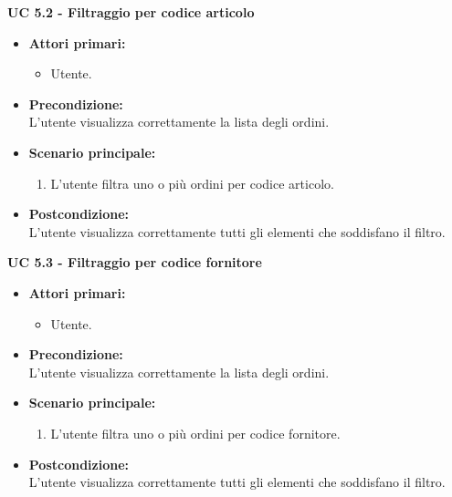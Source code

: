 \vspace{0.5cm}

\noindent \textbf{\large UC 5.2 - Filtraggio per codice articolo}
\label{uc:filtraggio-codice-articolo}
\begin{itemize}

	\item \textbf{Attori primari: }
		\begin{itemize}
			\item Utente.
		\end{itemize}

	\item \textbf{Precondizione: }\\[0.3cm]
		L'utente visualizza correttamente la lista degli ordini.

	\item \textbf{Scenario principale: }
		\begin{enumerate}
			\item L'utente filtra uno o più ordini per codice articolo.
		\end{enumerate}
		

	\item \textbf{Postcondizione: }\\[0.3cm]
		L'utente visualizza correttamente tutti gli elementi che soddisfano il filtro.

\end{itemize}

\vspace{0.5cm}

\noindent \textbf{\large UC 5.3 - Filtraggio per codice fornitore}
\label{uc:filtraggio-codice-fornitore}
\begin{itemize}

	\item \textbf{Attori primari: }
		\begin{itemize}
			\item Utente.
		\end{itemize}

	\item \textbf{Precondizione: }\\[0.3cm]
		L'utente visualizza correttamente la lista degli ordini.

	\item \textbf{Scenario principale: }
		\begin{enumerate}
			\item L'utente filtra uno o più ordini per codice fornitore.
		\end{enumerate}
		

	\item \textbf{Postcondizione: }\\[0.3cm]
		L'utente visualizza correttamente tutti gli elementi che soddisfano il filtro.

\end{itemize}

